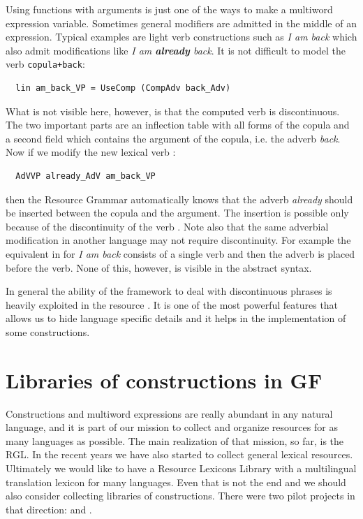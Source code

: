 \documentclass[output=paper]{langsci/langscibook}
\begin{document}
Using functions with arguments is just one of the ways to make
a multiword expression variable. Sometimes general modifiers 
are admitted in the middle of an expression.
Typical examples are light verb constructions such as \textit{I am back}
which also admit modifications like \textit{I am \textbf{already} back}.
It is not difficult to model the verb  \verb=copula+back=:
\begin{verbatim}
  lin am_back_VP = UseComp (CompAdv back_Adv)
\end{verbatim}
What is not visible here, however, is that the computed verb 
is discontinuous. The two important parts are an inflection table with
all forms of the copula and a second field which contains the argument
of the copula, i.e. the adverb \textit{back}. 
Now if we modify the new lexical verb :
\begin{verbatim}
  AdVVP already_AdV am_back_VP
\end{verbatim}
then the Resource Grammar automatically knows that the adverb
\textit{already} should be inserted between the copula and the argument.
The insertion is possible only because of the discontinuity of 
the verb . Note also that the same adverbial modification in another
language may not require discontinuity. For example the equivalent in
 for \textit{I am back} consists of a single verb and then 
the adverb is placed before the verb. None of this, however, is
visible in the abstract syntax.

In general the ability of the framework to deal with discontinuous phrases
is heavily exploited in the resource . It is one of the most powerful
features that allows us to hide language specific details and it helps
in the implementation of some constructions.

\section{Libraries of constructions in GF}

Constructions and multiword expressions are really abundant in 
any natural language, and it is part of our mission to collect and 
organize  resources for as many languages as possible. The main
realization of that mission, so far, is the RGL.
In the recent years we have also started to collect general lexical
resources. Ultimately we would like to have a Resource Lexicons Library
with a multilingual translation lexicon for many languages.
Even that is not the end and we should also consider collecting libraries
of constructions. There were two pilot projects in that direction:
\cite{gruzitis2015formalising} and \cite{enache2014handling}.
 
\end{document}
